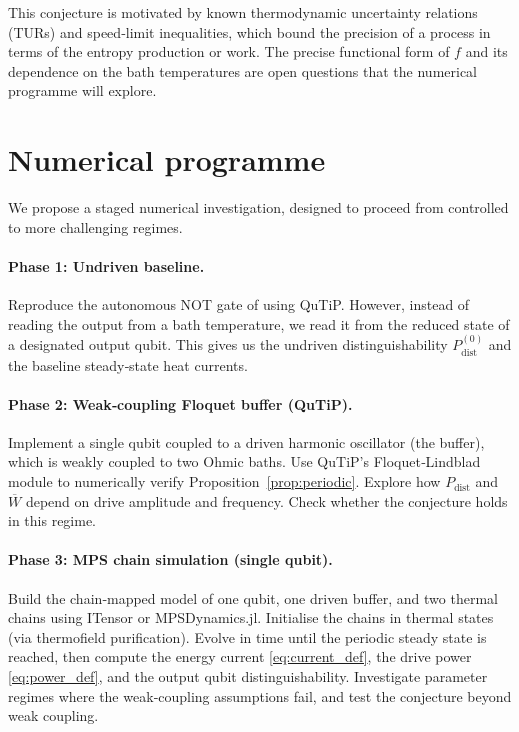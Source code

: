 \documentclass[11pt,a4paper]{article}
\theoremstyle{plain}
\theoremstyle{definition}
\theoremstyle{remark}
\begin{document}
This conjecture is motivated by known thermodynamic uncertainty relations (TURs) and speed‑limit inequalities, which bound the precision of a process in terms of the entropy production or work. The precise functional form of $f$ and its dependence on the bath temperatures are open questions that the numerical programme will explore.

\section{Numerical programme}\label{sec:numerics}
We propose a staged numerical investigation, designed to proceed from controlled to more challenging regimes.

\paragraph{Phase 1: Undriven baseline.}
Reproduce the autonomous NOT gate of \cite{LipkaBartosik2024} using QuTiP. However, instead of reading the output from a bath temperature, we read it from the reduced state of a designated output qubit. This gives us the undriven distinguishability $P_{\text{dist}}^{(0)}$ and the baseline steady‑state heat currents.

\paragraph{Phase 2: Weak‑coupling Floquet buffer (QuTiP).}
Implement a single qubit coupled to a driven harmonic oscillator (the buffer), which is weakly coupled to two Ohmic baths. Use QuTiP’s Floquet‑Lindblad module to numerically verify Proposition~\ref{prop:periodic}. Explore how $P_{\text{dist}}$ and $\overline{W}$ depend on drive amplitude and frequency. Check whether the conjecture holds in this regime.

\paragraph{Phase 3: MPS chain simulation (single qubit).}
Build the chain‑mapped model of one qubit, one driven buffer, and two thermal chains using ITensor or MPSDynamics.jl. Initialise the chains in thermal states (via thermofield purification). Evolve in time until the periodic steady state is reached, then compute the energy current \eqref{eq:current_def}, the drive power \eqref{eq:power_def}, and the output qubit distinguishability. Investigate parameter regimes where the weak‑coupling assumptions fail, and test the conjecture beyond weak coupling.
\end{document}
